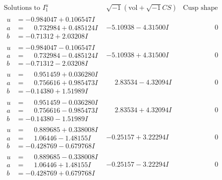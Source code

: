 \documentclass[1p]{elsarticle_modified}
\theoremstyle{definition}
\newcommand{\I}{\sqrt{-1}}
\begin{document}
$$\begin{array}{c|c|c}  
\text{Solutions to }I^u_{1}& \I (\text{vol} + \sqrt{-1}CS) & \text{Cusp shape}\\
 \hline 
\begin{aligned}
u &= -0.984047 + 0.106547 I \\
a &= \phantom{-}0.732984 + 0.485124 I \\
b &= -0.71312 + 2.03208 I\end{aligned}
 & -5.10938 - 4.31500 I & \phantom{-0.000000 } 0 \\ \hline\begin{aligned}
u &= -0.984047 - 0.106547 I \\
a &= \phantom{-}0.732984 - 0.485124 I \\
b &= -0.71312 - 2.03208 I\end{aligned}
 & -5.10938 + 4.31500 I & \phantom{-0.000000 } 0 \\ \hline\begin{aligned}
u &= \phantom{-}0.951459 + 0.036280 I \\
a &= \phantom{-}0.756616 + 0.985473 I \\
b &= -0.14380 + 1.51989 I\end{aligned}
 & \phantom{-}2.83534 - 4.32094 I & \phantom{-0.000000 } 0 \\ \hline\begin{aligned}
u &= \phantom{-}0.951459 - 0.036280 I \\
a &= \phantom{-}0.756616 - 0.985473 I \\
b &= -0.14380 - 1.51989 I\end{aligned}
 & \phantom{-}2.83534 + 4.32094 I & \phantom{-0.000000 } 0 \\ \hline\begin{aligned}
u &= \phantom{-}0.889685 + 0.338008 I \\
a &= \phantom{-}1.06446 - 1.48155 I \\
b &= -0.428769 - 0.679768 I\end{aligned}
 & -0.25157 + 3.22294 I & \phantom{-0.000000 } 0 \\ \hline\begin{aligned}
u &= \phantom{-}0.889685 - 0.338008 I \\
a &= \phantom{-}1.06446 + 1.48155 I \\
b &= -0.428769 + 0.679768 I\end{aligned}
 & -0.25157 - 3.22294 I & \phantom{-0.000000 } 0 \\ \hline\begin{aligned}

\end{aligned}
\end{array}$$
\end{document}
